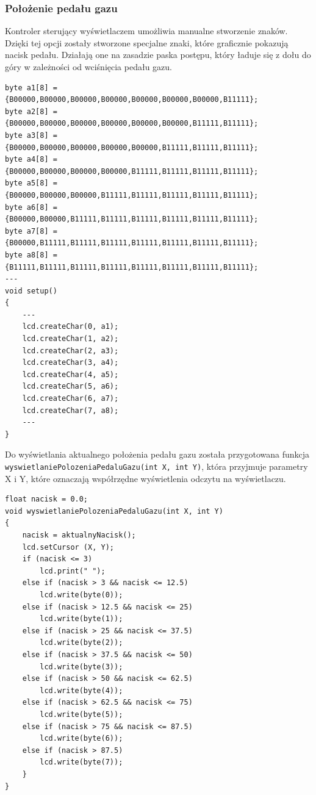\subsubsection{Położenie pedału gazu}
Kontroler sterujący wyświetlaczem umożliwia manualne stworzenie znaków. Dzięki tej opcji zostały stworzone specjalne znaki, które graficznie pokazują nacisk pedału. Działają one na zasadzie paska postępu, który ładuje się z dołu do góry w zależności od wciśnięcia pedału gazu.

\begin{lstlisting}[label=list:custom_char,caption=Tworzenie znaków specjalnych dla odczytu pedału gazu,
basicstyle=\footnotesize\ttfamily]
byte a1[8] = {B00000,B00000,B00000,B00000,B00000,B00000,B00000,B11111};
byte a2[8] = {B00000,B00000,B00000,B00000,B00000,B00000,B11111,B11111};
byte a3[8] = {B00000,B00000,B00000,B00000,B00000,B11111,B11111,B11111};
byte a4[8] = {B00000,B00000,B00000,B00000,B11111,B11111,B11111,B11111};
byte a5[8] = {B00000,B00000,B00000,B11111,B11111,B11111,B11111,B11111};
byte a6[8] = {B00000,B00000,B11111,B11111,B11111,B11111,B11111,B11111};
byte a7[8] = {B00000,B11111,B11111,B11111,B11111,B11111,B11111,B11111};
byte a8[8] = {B11111,B11111,B11111,B11111,B11111,B11111,B11111,B11111};
---
void setup()
{
    ---
    lcd.createChar(0, a1);
	lcd.createChar(1, a2);
	lcd.createChar(2, a3);
	lcd.createChar(3, a4);
	lcd.createChar(4, a5);
	lcd.createChar(5, a6);
	lcd.createChar(6, a7);
	lcd.createChar(7, a8);
    ---
}
\end{lstlisting}

Do wyświetlania aktualnego położenia pedału gazu została przygotowana funkcja \texttt{wyswietlaniePolozeniaPedaluGazu(int X, int Y)}, która przyjmuje parametry X i Y, które oznaczają współrzędne wyświetlenia odczytu na wyświetlaczu.
\begin{lstlisting}[label=list:show_fuel_avarge,caption=Wyświetlanie średniego spalonego paliwa na 100km,
basicstyle=\footnotesize\ttfamily]
float nacisk = 0.0;
void wyswietlaniePolozeniaPedaluGazu(int X, int Y)
{
    nacisk = aktualnyNacisk();
    lcd.setCursor (X, Y);
    if (nacisk <= 3)
    	lcd.print(" ");
    else if (nacisk > 3 && nacisk <= 12.5)
    	lcd.write(byte(0));
    else if (nacisk > 12.5 && nacisk <= 25)
    	lcd.write(byte(1));
    else if (nacisk > 25 && nacisk <= 37.5)
    	lcd.write(byte(2));
    else if (nacisk > 37.5 && nacisk <= 50)
    	lcd.write(byte(3));
    else if (nacisk > 50 && nacisk <= 62.5)
    	lcd.write(byte(4));
    else if (nacisk > 62.5 && nacisk <= 75)
    	lcd.write(byte(5));
    else if (nacisk > 75 && nacisk <= 87.5)
    	lcd.write(byte(6));
    else if (nacisk > 87.5)
    	lcd.write(byte(7));
    }
}
\end{lstlisting}

